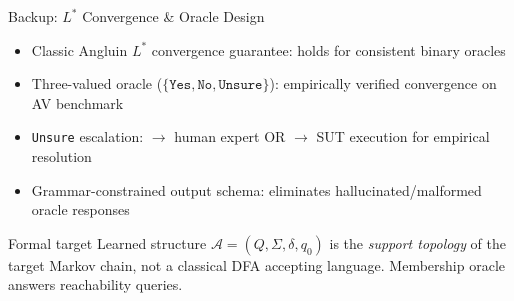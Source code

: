 \documentclass[aspectratio=169,10pt]{beamer}
\begin{document}
\begin{frame}{Backup: $L^*$ Convergence \& Oracle Design}
  \begin{itemize}
    \item Classic Angluin $L^*$ convergence guarantee: holds for consistent binary oracles
    \item Three-valued oracle ($\{\texttt{Yes},\texttt{No},\texttt{Unsure}\}$): empirically verified convergence on AV benchmark
    \item \texttt{Unsure} escalation: $\to$ human expert OR $\to$ SUT execution for empirical resolution
    \item Grammar-constrained output schema: eliminates hallucinated/malformed oracle responses
  \end{itemize}
  \vspace{0.3em}
  \begin{block}{Formal target}
    Learned structure $\mathcal{A} = (Q,\Sigma,\delta,q_0)$ is the \emph{support topology} of the target Markov chain, not a classical DFA accepting language. Membership oracle answers reachability queries.
  \end{block}
\end{frame}
\end{document}

